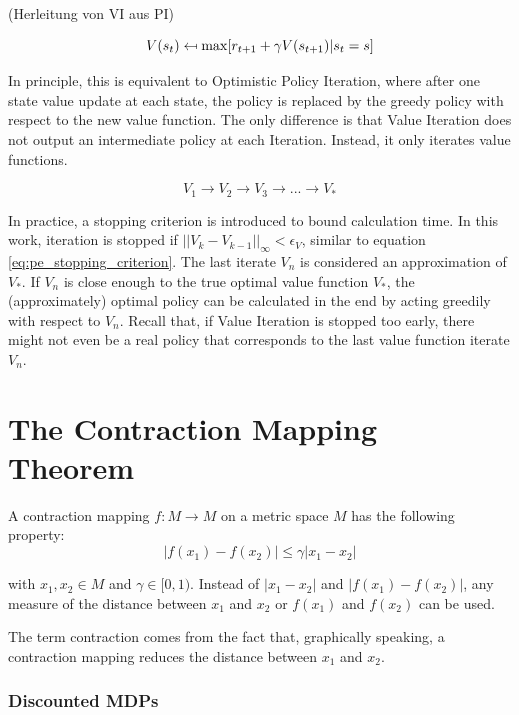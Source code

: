 (Herleitung von VI aus PI)

\begin{equation}
V(s_t) \mathrel{\reflectbox{\ensuremath{\mapsto}}} 
\max[r_{t+1}+\gamma V(s_{t+1})|s_t=s]
\label{eq:value_iteration_update}
\end{equation}

In principle, this is equivalent to Optimistic Policy Iteration, where after one state value update at each state, the policy is replaced by the greedy policy with respect to the new value function. The only difference is that Value Iteration does not output an intermediate policy at each Iteration. Instead, it only iterates value functions. 

\begin{equation}
V_1 \longrightarrow V_2 \longrightarrow V_3 \longrightarrow ... \longrightarrow  V_*
\label{eq:vi_scheme}
\end{equation}

In practice, a stopping criterion is introduced to bound calculation time. In this work, iteration is stopped if $||V_{k}-V_{k-1}||_\infty<\epsilon_V$, similar to equation \ref{eq:pe_stopping_criterion}. The last iterate $V_n$ is considered an approximation of $V_*$. If $V_n$ is close enough to the true optimal value function $V_*$, the (approximately) optimal policy can be calculated in the end by acting greedily with respect to $V_n$. Recall that, if Value Iteration is stopped too early, there might not even be a real policy that corresponds to the last value function iterate $V_n$.

\section{The Contraction Mapping Theorem}
\label{sec:contraction_mappings}
A contraction mapping $f: M \to M$ on a metric space $M$ has the following property:
\begin{equation}
|f(x_1)-f(x_2)| \leq \gamma |x_1-x_2|
\end{equation}

with $x_1,x_2 \in M$ and $\gamma \in [0,1)$. Instead of $|x_1-x_2|$ and $|f(x_1)-f(x_2)|$, any measure of the distance between $x_1$ and $x_2$ or $f(x_1)$ and $f(x_2)$ can be used.

The term contraction comes from the fact that, graphically speaking, a contraction mapping reduces the distance between $x_1$ and $x_2$.

\subsubsection{Discounted MDPs}

